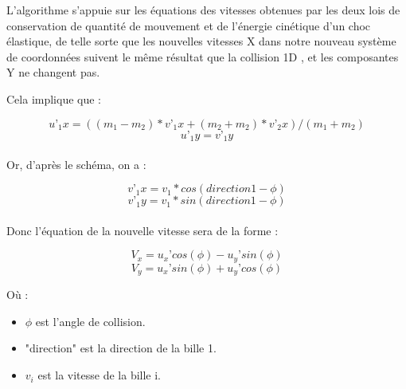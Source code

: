 \documentclass{report}
\begin{document}
L’algorithme s'appuie sur les équations des vitesses obtenues par les deux lois de conservation de quantité de mouvement et de l’énergie cinétique d’un choc élastique, de telle sorte que les nouvelles vitesses X dans notre nouveau système de coordonnées suivent le même résultat que la collision 1D \cite{02}, et les composantes Y ne changent pas. \\

\newpage

Cela implique que :

\[u’_1x = ((m_1-m_2)*v’_1x+(m_2+m_2)*v’_2x)/(m_1+m_2)\]
\[u’_1y = v’_1y\] \\

Or, d'après le schéma, on a :

\[v’_1x = v_1*cos(direction1-\phi)\]
\[v’_1y = v_1*sin(direction1-\phi)\] \\

Donc l'équation de la nouvelle vitesse sera de la forme :

\[V_x = u_x’ cos(\phi) - u_y’ sin(\phi)\]
\[V_y = u_x’ sin(\phi) + u_y’ cos(\phi)\]

Où :

\begin{itemize}
\item \(\phi\) est l'angle de collision.
\item "direction" est la direction de la bille 1.
\item \(v_i\) est la vitesse de la bille i.
\end{itemize}
\end{document}
